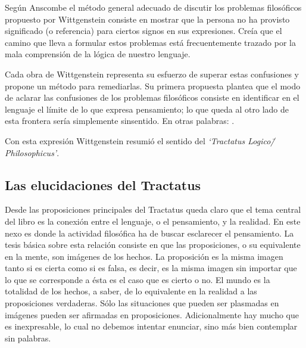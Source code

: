 Según Anscombe el método general adecuado de discutir los problemas filosóficos
propuesto por Wittgenstein consiste en mostrar que la persona no ha provisto
significado (o referencia) para ciertos signos en sus expresiones.\autocite[cf.
p. 151]{anscombe1959iwt} Creía que el camino que lleva a formular estos problemas está
frecuentemente trazado por la mala comprensión de la lógica de nuestro lenguaje.

Cada obra de Wittgenstein representa su esfuerzo de superar estas confusiones
y propone un método para remediarlas. Su primera propuesta plantea que el modo
de aclarar las confusiones de los problemas filosóficos consiste en
identificar en el lenguaje el límite de lo que expresa pensamiento; lo que
queda al otro lado de esta frontera sería simplemente sinsentido. En otras
palabras: .
\autocite[prefacio]{wittgenstein1922tractatus}

Con esta expresión Wittgenstein resumió el sentido del \emph{`Tractatus
Logico\=/Philosophicus'}.

\subsection{Las elucidaciones del Tractatus}
Desde las proposiciones principales del Tractatus queda claro que el tema
central del libro es la conexión entre el lenguaje, o el pensamiento, y la
realidad.
En este nexo es donde la actividad filosófica ha de buscar esclarecer el
pensamiento.
La tesis básica sobre esta relación consiste en que las proposiciones, o su
equivalente en la mente, son imágenes de los hechos.
La proposición es la misma imagen tanto si es cierta como si es falsa, es decir,
es la misma imagen sin importar que lo que se corresponde a ésta es el caso que
es cierto o no. El mundo es la totalidad de los hechos, a saber, de lo
equivalente en la realidad a las proposiciones verdaderas.
Sólo las situaciones que pueden ser plasmadas en imágenes pueden ser afirmadas
en proposiciones. Adicionalmente hay mucho que es inexpresable, lo cual no
debemos intentar enunciar, sino más bien contemplar sin palabras.\autocite[cf.
p.19]{anscombe1959iwt}

